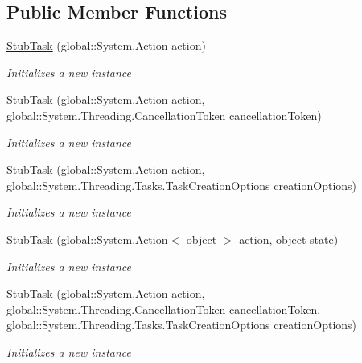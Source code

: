 \subsection*{Public Member Functions}
\begin{DoxyCompactItemize}
\item 
\hyperlink{class_system_1_1_threading_1_1_tasks_1_1_fakes_1_1_stub_task_abe7d2f6887f0af7481388ddb82a9e718}{Stub\-Task} (global\-::\-System.\-Action action)
\begin{DoxyCompactList}\small\item\em Initializes a new instance\end{DoxyCompactList}\item 
\hyperlink{class_system_1_1_threading_1_1_tasks_1_1_fakes_1_1_stub_task_ae0dcdfd403d2f837d6f75ad025e7b731}{Stub\-Task} (global\-::\-System.\-Action action, global\-::\-System.\-Threading.\-Cancellation\-Token cancellation\-Token)
\begin{DoxyCompactList}\small\item\em Initializes a new instance\end{DoxyCompactList}\item 
\hyperlink{class_system_1_1_threading_1_1_tasks_1_1_fakes_1_1_stub_task_a7ea64f798f16a0d254ac72e5f23eb684}{Stub\-Task} (global\-::\-System.\-Action action, global\-::\-System.\-Threading.\-Tasks.\-Task\-Creation\-Options creation\-Options)
\begin{DoxyCompactList}\small\item\em Initializes a new instance\end{DoxyCompactList}\item 
\hyperlink{class_system_1_1_threading_1_1_tasks_1_1_fakes_1_1_stub_task_a3f5a8c01511f17d5d60d53d1ee939ede}{Stub\-Task} (global\-::\-System.\-Action$<$ object $>$ action, object state)
\begin{DoxyCompactList}\small\item\em Initializes a new instance\end{DoxyCompactList}\item 
\hyperlink{class_system_1_1_threading_1_1_tasks_1_1_fakes_1_1_stub_task_a6c4b5e7f95618f768c6502fdb6d81ea6}{Stub\-Task} (global\-::\-System.\-Action action, global\-::\-System.\-Threading.\-Cancellation\-Token cancellation\-Token, global\-::\-System.\-Threading.\-Tasks.\-Task\-Creation\-Options creation\-Options)
\begin{DoxyCompactList}\small\item\em Initializes a new instance\end{DoxyCompactList}\item 

\end{DoxyCompactItemize}
